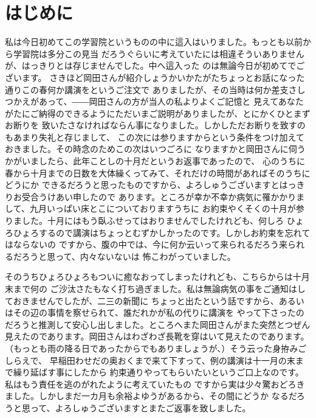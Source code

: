 \chapter{はじめに}
  私は今日初めてこの学習院というものの中に這入はいりました。もっとも以前から学習院は多分この見当
  だろうぐらいに考えていたには相違そういありませんが、はっきりとは存じませんでした。中へ這入った
  のは無論今日が初めてでございます。
  さきほど岡田さんが紹介しょうかいかたがたちょっとお話になった通りこの春何か講演をというご注文で
  ありましたが、その当時は何か差支さしつかえがあって、――岡田さんの方が当人の私よりよくご記憶と
  見えてあなたがたにご納得のできるようにただいまご説明がありましたが、とにかくひとまずお断りを
  致いたさなければならん事になりました。しかしただお断りを致すのもあまり失礼と存じまして、
  この次には参りますからという条件をつけ加えておきました。その時念のためこの次はいつごろに
  なりますかと岡田さんに伺うかがいましたら、此年ことしの十月だというお返事であったので、
  心のうちに春から十月までの日数を大体繰くってみて、それだけの時間があればそのうちにどうにか
  できるだろうと思ったものですから、よろしゅうございますとはっきりお受合うけあい申したので
  あります。ところが幸か不幸か病気に罹かかりまして、九月いっぱい床とこについておりますうちに
  お約束やくそくの十月が参りました。十月にはもう臥ふせってはおりませんでしたけれども、何しろ
  ひょろひょろするので講演はちょっとむずかしかったのです。しかしお約束を忘れてはならないの
  ですから、腹の中では、今に何か云いって来られるだろう来られるだろうと思って、内々ないないは
  怖こわがっていました。

  そのうちひょろひょろもついに癒なおってしまったけれども、こちらからは十月末まで何の
  ご沙汰さたもなく打ち過ぎました。私は無論病気の事をご通知はしておきませんでしたが、二三の新聞に
  ちょっと出たという話ですから、あるいはその辺の事情を察せられて、誰だれかが私の代りに講演を
  やって下さったのだろうと推測して安心し出しました。ところへまた岡田さんがまた突然とつぜん
  見えたのであります。岡田さんはわざわざ長靴を穿はいて見えたのであります。
  （もっとも雨の降る日であったからでもありましょうが、）そう云った身拵みごしらえで、
  早稲田わせだの奥おくまで来て下すって、例の講演は十一月の末まで繰り延ばす事にしたから
  約束通りやってもらいたいというご口上なのです。私はもう責任を逃のがれたように考えていたもの
  ですから実は少々驚おどろきました。しかしまだ一カ月も余裕よゆうがあるから、その間にどうか
  なるだろうと思って、よろしゅうございますとまたご返事を致しました。


